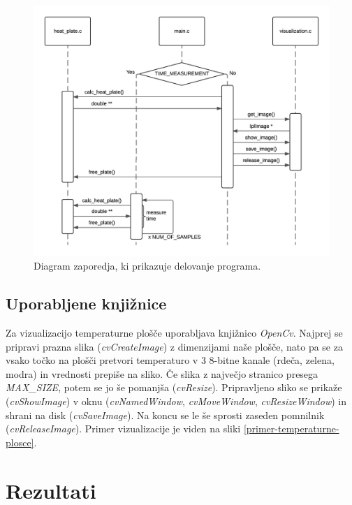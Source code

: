 \documentclass[a4paper,11pt]{article}
\begin{document}
\begin{figure}[H]
\begin{center}
\includegraphics[scale=0.8]{flow.png}
\end{center}
\caption{Diagram zaporedja, ki prikazuje delovanje programa.}
\label{diagram-zaporedja-sekvencni}
\end{figure}

\subsection{Uporabljene knjižnice} \label{section-uporabljene-knjiznice}

\indent \par Za vizualizacijo temperaturne plošče uporabljava knjižnico \textit{OpenCv}. Najprej se pripravi prazna slika (\textit{cvCreateImage}) z dimenzijami naše plošče, nato pa se za vsako točko na plošči pretvori temperaturo v 3 8-bitne kanale (rdeča, zelena, modra) in vrednosti prepiše na sliko. Če slika z največjo stranico presega \textit{MAX\_SIZE}, potem se jo še pomanjša (\textit{cvResize}). Pripravljeno sliko se prikaže (\textit{cvShowImage}) v oknu (\textit{cvNamedWindow}, \textit{cvMoveWindow}, \textit{cvResizeWindow}) in shrani na disk (\textit{cvSaveImage}). Na koncu se le še sprosti zaseden pomnilnik (\textit{cvReleaseImage}). Primer vizualizacije je viden na sliki \ref{primer-temperaturne-plosce}.

\section{Rezultati}
\end{document}
